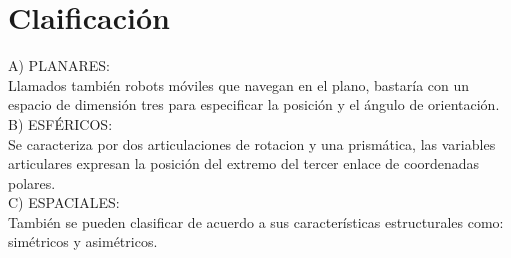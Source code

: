\documentclass[12pt,a4paper]{article}
\begin{document}
\section{Claificación}
A) PLANARES:\\
Llamados también robots móviles que navegan en el plano, bastaría con un espacio de dimensión tres para especificar la posición y el ángulo de orientación.\\
B) ESFÉRICOS:\\
Se caracteriza por dos articulaciones de rotacion y una prismática, las variables articulares expresan la posición del extremo del tercer enlace de coordenadas polares.\\
C) ESPACIALES:\\
También se pueden clasificar de acuerdo a sus características estructurales como: simétricos y asimétricos.\\
\end{document}
